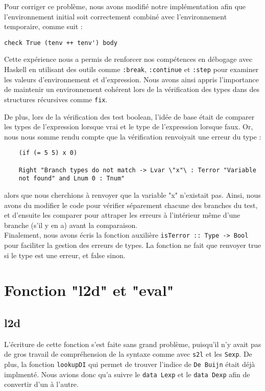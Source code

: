 \documentclass{article}
\begin{document}
\begin{justify}
Pour corriger ce problème, nous avons modifié notre implémentation afin que l’environnement
initial soit correctement combiné avec l’environnement temporaire, comme suit :
\end{justify}
\begin{lstlisting}
check True (tenv ++ tenv') body
\end{lstlisting}

\begin{justify}
Cette expérience nous a permis de renforcer nos compétences en débogage avec Haskell en utilisant
des outils comme \texttt{:break}, \texttt{:continue} et \texttt{:step} pour examiner les valeurs d’environnement
et d’expression. Nous avons ainsi appris l’importance de maintenir un environnement cohérent
lors de la vérification des types dans des structures récursives comme \texttt{fix}.
\end{justify}

De plus, lors de la vérification des test boolean, l'idée de base était de comparer les types de l'expression lorsque vrai et le type de l'expression lorsque faux. Or, nous nous somme rendu compte que la vérification renvoiyait une erreur du type : 
\begin{verbatim}
    (if (= 5 5) x 0)
    
    Right "Branch types do not match -> Lvar \"x"\ : Terror "Variable 
    not found" and Lnum 0 : Tnum"
\end{verbatim}
alors que nous cherchions à renvoyer que la variable "x" n'existait pas. Ainsi, nous avons du modifier le code pour vérifier séparement chacune des branches du test, et d'ensuite les comparer pour attraper les erreurs à l'intérieur même d'une branche (s'il y en a) avant la comparaison. 
\\

Finalement, nous avons écris la fonction auxilière \texttt{isTerror :: Type -> Bool} pour faciliter la gestion des erreurs de types. La fonction ne fait que renvoyer true si le type est une erreur, et false sinon.

\section*{Fonction "l2d" et "eval"}
\subsection*{l2d}
L'écriture de cette fonction s'est faite sans grand problème, puisqu'il n'y avait pas de gros travail de compréhension de la syntaxe comme avec \texttt{s2l} et les \texttt{Sexp}. De plus, la fonction \texttt{lookupDI} qui permet de trouver l'indice de \texttt{De Buijn} était déjà implmenté. Nous avions donc qu'a suivre le \texttt{data Lexp} et le \texttt{data Dexp} afin de convertir d'un à l'autre.
\end{document}
